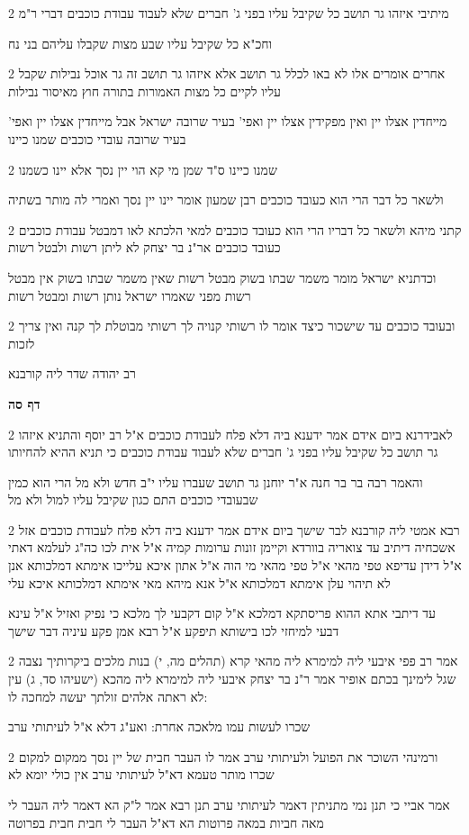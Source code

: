 \documentclass[12pt, openany]{book}
\newcommand{\sethebfont}{
\fontsize{10.5pt}{21.0pt} \selectfont
}
\newcommand{\twocol}[1]{
	{\sethebfont \begin{multicols}{2}
			#1
	\end{multicols}}	
}
\newcommand{\sectname}{}
\newcommand{\newsection}[1]{
	\addcontentsline{toc}{section}{#1}
	\renewcommand{\sectname}{#1}	
	\vspace{-\baselineskip}
	\begin{center}
		\textbf{%
\fontsize{16pt}{16pt}\selectfont
			#1}
	\end{center}
	\vspace{-\baselineskip}
	\nopagebreak
}
\begin{document}
\twocol{מיתיבי איזהו גר תושב כל שקיבל עליו בפני ג' חברים שלא לעבוד עבודת כוכבים דברי ר"מ
\par וחכ"א כל שקיבל עליו שבע מצות שקבלו עליהם בני נח}
\twocol{אחרים אומרים אלו לא באו לכלל גר תושב אלא איזהו גר תושב זה גר אוכל נבילות שקבל עליו לקיים כל מצות האמורות בתורה חוץ מאיסור נבילות
\par מייחדין אצלו יין ואין מפקידין אצלו יין ואפי' בעיר שרובה ישראל אבל מייחדין אצלו יין ואפי' בעיר שרובה עובדי כוכבים שמנו כיינו}
\twocol{שמנו כיינו ס"ד שמן מי קא הוי יין נסך אלא יינו כשמנו
\par ולשאר כל דבר הרי הוא כעובד כוכבים רבן שמעון אומר יינו יין נסך ואמרי לה מותר בשתיה}
\twocol{קתני מיהא ולשאר כל דבריו הרי הוא כעובד כוכבים למאי הלכתא לאו דמבטל עבודת כוכבים כעובד כוכבים אר"נ בר יצחק לא ליתן רשות ולבטל רשות
\par וכדתניא ישראל מומר משמר שבתו בשוק מבטל רשות שאין משמר שבתו בשוק אין מבטל רשות מפני שאמרו ישראל נותן רשות ומבטל רשות}
\twocol{ובעובד כוכבים עד שישכור כיצד אומר לו רשותי קנויה לך רשותי מבוטלת לך קנה ואין צריך לזכות
\par רב יהודה שדר ליה קורבנא}
\newsection{דף סה}
\twocol{לאבידרנא ביום אידם אמר ידענא ביה דלא פלח לעבודת כוכבים א"ל רב יוסף והתניא איזהו גר תושב כל שקיבל עליו בפני ג' חברים שלא לעבוד עבודת כוכבים כי תניא ההיא להחיותו
\par והאמר רבה בר בר חנה א"ר יוחנן גר תושב שעברו עליו י"ב חדש ולא מל הרי הוא כמין שבעובדי כוכבים התם כגון שקיבל עליו למול ולא מל}
\twocol{רבא אמטי ליה קורבנא לבר שישך ביום אידם אמר ידענא ביה דלא פלח לעבודת כוכבים אזל אשכחיה דיתיב עד צואריה בוורדא וקיימן זונות ערומות קמיה א"ל אית לכו כה"ג לעלמא דאתי א"ל דידן עדיפא טפי מהאי א"ל טפי מהאי מי הוה א"ל אתון איכא עלייכו אימתא דמלכותא אנן לא תיהוי עלן אימתא דמלכותא א"ל אנא מיהא מאי אימתא דמלכותא איכא עלי
\par עד דיתבי אתא ההוא פריסתקא דמלכא א"ל קום דקבעי לך מלכא כי נפיק ואזיל א"ל עינא דבעי למיחזי לכו בישותא תיפקע א"ל רבא אמן פקע עיניה דבר שישך}
\twocol{אמר רב פפי איבעי ליה למימרא ליה מהאי קרא (תהלים מה, י) בנות מלכים ביקרותיך נצבה שגל לימינך בכתם אופיר אמר ר"נ בר יצחק איבעי ליה למימרא ליה מהכא (ישעיהו סד, ג) עין לא ראתה אלהים זולתך יעשה למחכה לו:
\par שכרו לעשות עמו מלאכה אחרת: ואע"ג דלא א"ל לעיתותי ערב}
\twocol{ורמינהי השוכר את הפועל ולעיתותי ערב אמר לו העבר חבית של יין נסך ממקום למקום שכרו מותר טעמא דא"ל לעיתותי ערב אין כולי יומא לא
\par אמר אביי כי תנן נמי מתניתין דאמר לעיתותי ערב תנן רבא אמר ל"ק הא דאמר ליה העבר לי מאה חביות במאה פרוטות הא דא"ל העבר לי חבית חבית בפרוטה}
\end{document}
